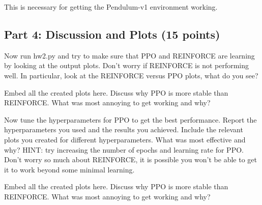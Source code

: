\documentclass[11pt]{article}
\begin{document}
This is necessary for getting the Pendulum-v1 environment working.

\subsection*{Part 4: Discussion and Plots (15 points)}

Now run hw2.py and try to make sure that PPO and REINFORCE are learning by looking at the output plots. Don't worry if REINFORCE is not performing well. In particular, look at the REINFORCE versus PPO plots, what do you see?

\begin{solution}
  Embed all the created plots here. Discuss why PPO is more stable than REINFORCE. What was most annoying to get working and why?
\end{solution}


Now tune the hyperparameters for PPO to get the best performance. Report the hyperparameters you used and the results you achieved. Include the relevant plots you created for different hyperparameters. What was most effective and why? HINT: try increasing the number of epochs and learning rate for PPO. Don't worry so much about REINFORCE, it is possible you won't be able to get it to work beyond some minimal learning.

\begin{solution}
  Embed all the created plots here. Discuss why PPO is more stable than REINFORCE. What was most annoying to get working and why?
\end{solution}
\end{document}
